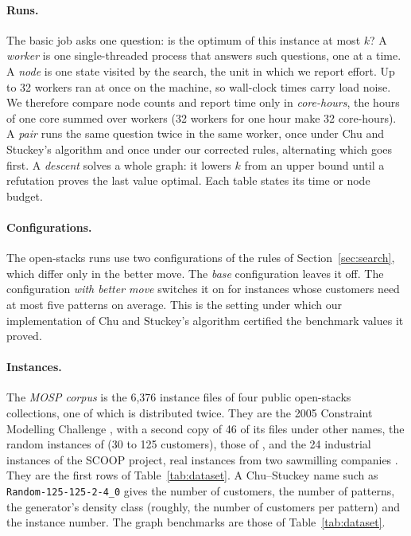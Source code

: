 \paragraph{Runs.} The basic job asks one question: is the optimum of this
instance at most $k$? A \emph{worker} is one single-threaded process that
answers such questions, one at a time. A \emph{node} is one state visited by
the search, the unit in which we report effort. Up to 32 workers ran at
once on the machine, so wall-clock times carry load noise. We therefore
compare node counts and report time only in \emph{core-hours}, the hours of one core summed over workers (32 workers for one hour make 32 core-hours). A \emph{pair} runs
the same question twice in the same worker, once under Chu and Stuckey's algorithm
and once under our corrected rules, alternating which goes first. A
\emph{descent} solves a whole graph: it lowers $k$ from an upper bound until a
refutation proves the last value optimal. Each table states its time or node
budget.

\paragraph{Configurations.} The open-stacks runs use two configurations of the
rules of Section~\ref{sec:search}, which differ only in the better move. The
\emph{base} configuration leaves it off. The configuration \emph{with better
move} switches it on for instances whose customers need at most five patterns on
average. This is the setting under which our implementation of Chu and Stuckey's algorithm certified the benchmark values it proved.

\paragraph{Instances.} The \emph{MOSP corpus} is the 6,376 instance files of
four public open-stacks collections, one of which is distributed twice. They
are the 2005 Constraint Modelling Challenge \citep{SmithGent2005}, with a
second copy of 46 of its files under other names, the random
instances of \citet{ChuStuckey2009} (30 to 125 customers), those of
\citet{FaggioliBentivoglio1998}, and the 24 industrial instances of the SCOOP project, real instances from two sawmilling companies \citep{Frinhani2018}. They
are the first rows of Table~\ref{tab:dataset}. A Chu--Stuckey name such as
\texttt{Random-125-125-2-4\_0} gives the number of customers, the number of
patterns, the generator's density class (roughly, the number of customers per pattern) and the instance number. The graph benchmarks are those of Table~\ref{tab:dataset}.


